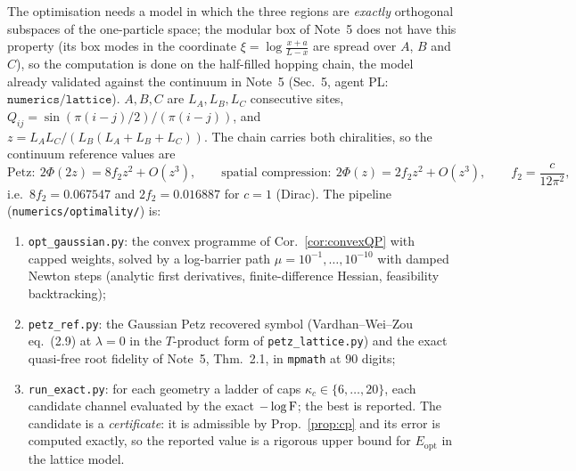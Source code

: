 \documentclass[11pt]{article}
\newcommand{\Erec}{E_{\mathrm{opt}}}
\begin{document}
The optimisation needs a model in which the three regions are \emph{exactly}
orthogonal subspaces of the one-particle space; the modular box of Note~5 does
not have this property (its box modes in the coordinate
\(\xi=\log\frac{x+a}{L-x}\) are spread over \(A\), \(B\) and \(C\)), so the
computation is done on the half-filled hopping chain, the model already
validated against the continuum in Note~5 (Sec.~5, agent PL:
\(\texttt{numerics/lattice}\)).  \(A,B,C\) are \(L_A,L_B,L_C\) consecutive sites,
\(Q_{ij}=\sin(\pi(i-j)/2)/(\pi(i-j))\), and \(z=L_AL_C/(L_B(L_A+L_B+L_C))\).
The chain carries both chiralities, so the continuum reference values are
\begin{equation}\label{eq:refvalues}
 \text{Petz}:\ 2\Phi(2z)=8f_2z^2+O(z^3),\qquad
 \text{spatial compression}:\ 2\Phi(z)=2f_2z^2+O(z^3),\qquad
 f_2=\frac{c}{12\pi^2},
\end{equation}
i.e.\ \(8f_2=0.067547\) and \(2f_2=0.016887\) for \(c=1\) (Dirac).  The pipeline
(\texttt{numerics/optimality/}) is:
\begin{enumerate}[leftmargin=1.6em,itemsep=1pt]
\item \texttt{opt\_gaussian.py}: the convex programme of
 Cor.~\ref{cor:convexQP} with capped weights, solved by a log-barrier path
 \(\mu=10^{-1},\dots,10^{-10}\) with damped Newton steps (analytic first
 derivatives, finite-difference Hessian, feasibility backtracking);
\item \texttt{petz\_ref.py}: the Gaussian Petz recovered symbol (Vardhan--Wei--Zou
 eq.~(2.9) at \(\lambda=0\) in the \(T\)-product form of \texttt{petz\_lattice.py})
 and the exact quasi-free root fidelity of Note~5, Thm.~2.1, in \texttt{mpmath}
 at \(90\) digits;
\item \texttt{run\_exact.py}: for each geometry a ladder of caps
 \(\kappa_c\in\{6,\dots,20\}\), each candidate channel evaluated by the exact
 \(-\log\operatorname{F}\); the best is reported.  The candidate is a \emph{certificate}: it
 is admissible by Prop.~\ref{prop:cp} and its error is computed exactly, so the
 reported value is a rigorous upper bound for \(\Erec\) in the lattice model.
\end{enumerate}
\end{document}
